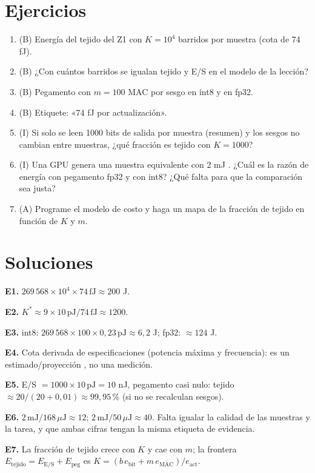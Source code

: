 \documentclass[11pt,a4paper]{article}
\begin{document}
\section{Ejercicios}
\begin{enumerate}[label=\textbf{E\arabic*.}]
\item (B) Energía del tejido del Z1 con $K=10^4$ barridos por muestra (cota de 74 fJ).
\item (B) ¿Con cuántos barridos se igualan tejido y E/S en el modelo de la lección?
\item (B) Pegamento con $m=100$ MAC por sesgo en int8 y en fp32.
\item (B) Etiquete: «74 fJ por actualización».
\item (I) Si solo se leen 1000 bits de salida por muestra (resumen) y los sesgos no cambian entre muestras, ¿qué fracción es tejido con $K=1000$?
\item (I) Una GPU genera una muestra equivalente con 2 mJ \evE. ¿Cuál es la razón de energía con pegamento fp32 y con int8? ¿Qué falta para que la comparación sea justa?
\item (A) Programe el modelo de costo y haga un mapa de la fracción de tejido en función de $K$ y $m$.
\end{enumerate}
\section{Soluciones}
\begin{solucion}
\textbf{E1.} $269\,568\times10^4\times74\,\text{fJ}\approx200$ \textmu J.

\textbf{E2.} $K^\ast\approx9\times10\,\text{pJ}/74\,\text{fJ}\approx1200$.

\textbf{E3.} int8: $269\,568\times100\times0{,}23\,\text{pJ}\approx6{,}2$ \textmu J; fp32: $\approx124$ \textmu J.

\textbf{E4.} Cota derivada de especificaciones (potencia máxima y frecuencia): es un estimado/proyección \evP, no una medición.

\textbf{E5.} E/S $=1000\times10\,\text{pJ}=10$ nJ, pegamento casi nulo: tejido $\approx20/(20+0{,}01)\approx99{,}95\,\%$ (si no se recalculan sesgos).

\textbf{E6.} $2\,\text{mJ}/168\,\mu\text{J}\approx12$; $2\,\text{mJ}/50\,\mu\text{J}\approx40$. Falta igualar la calidad de las muestras y la tarea, y que ambas cifras tengan la misma etiqueta de evidencia.

\textbf{E7.} La fracción de tejido crece con $K$ y cae con $m$; la frontera $E_{\text{tejido}}=E_{\text{E/S}}+E_{\text{peg}}$ es $K=(b\,e_{\text{bit}}+m\,e_{\text{MAC}})/e_{\text{act}}$.
\end{solucion}
\end{document}
